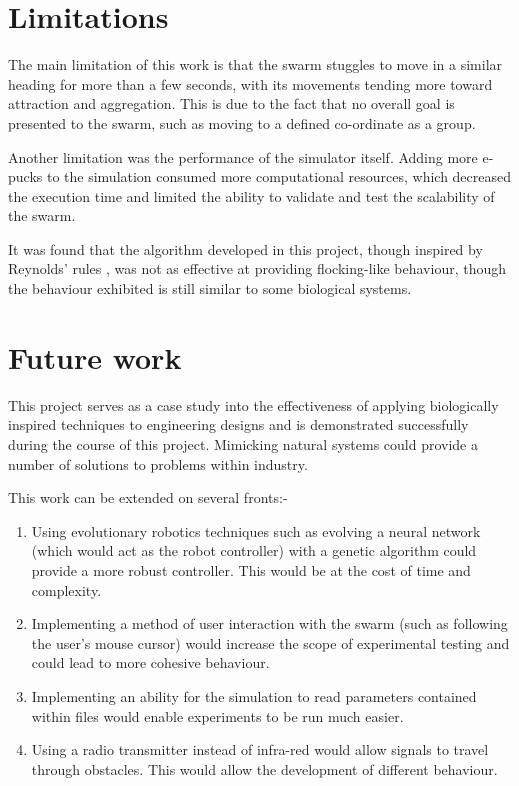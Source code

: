 \section{Limitations}

The main limitation of this work is that the swarm stuggles to move in a similar heading for more than a few seconds, with its movements tending more toward attraction and aggregation. This is due to the fact that no overall goal is presented to the swarm, such as moving to a defined co-ordinate as a group. 

Another limitation was the performance of the simulator itself. Adding more e-pucks to the simulation consumed more computational resources, which decreased the execution time and limited the ability to validate and test the scalability of the swarm.

It was found that the algorithm developed in this project, though inspired by Reynolds' rules \cite{Reynolds:1987:FHS:37402.37406}, was not as effective at providing flocking-like behaviour, though the behaviour exhibited is still similar to some biological systems.

\section{Future work}

This project serves as a case study into the effectiveness of applying biologically inspired techniques to engineering designs and is demonstrated successfully during the course of this project. Mimicking natural systems could provide a number of solutions to problems within industry. 

This work can be extended on several fronts:-

\begin{enumerate}
	\item Using evolutionary robotics techniques such as evolving a neural network (which would act as the robot controller) with a genetic algorithm could provide a more robust controller. This would be at the cost of time and complexity.
	\item Implementing a method of user interaction with the swarm (such as following the user's mouse cursor) would increase the scope of experimental testing and could lead to more cohesive behaviour.
	\item Implementing an ability for the simulation to read parameters contained within files would enable experiments to be run much easier.
	\item Using a radio transmitter instead of infra-red would allow signals to travel through obstacles. This would allow the development of different behaviour.
\end{enumerate} 